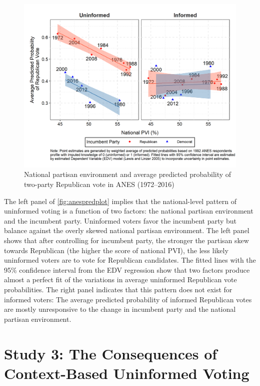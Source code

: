 \documentclass[letterpaper, 12pt]{article}
\begin{document}
    \begin{figure}[t!]
        \caption{National partisan environment and average predicted probability of two-party Republican vote in ANES (1972--2016)}
        \label{fig:anespredplot}
        \includegraphics[width=\linewidth]{../outputs/m1sq_1992_anespredplot.png}
    \end{figure}

    \par The left panel of \autoref{fig:anespredplot} implies that the national-level pattern of uninformed voting is a function of two factors: the national partisan environment and the incumbent party. Uninformed voters favor the incumbent party but balance against the overly skewed national partisan environment. The left panel shows that after controlling for incumbent party, the stronger the partisan skew towards Republican (the higher the score of national PVI), the less likely uninformed voters are to vote for Republican candidates. The fitted lines with the 95\% confidence interval from the EDV regression show that two factors produce almost a perfect fit of the variations in average uninformed Republican vote probabilities. The right panel indicates that this pattern does not exist for informed voters: The average predicted probability of informed Republican votes are mostly unresponsive to the change in incumbent party and the national partisan environment.

    \section*{Study 3: The Consequences of Context-Based Uninformed Voting}
\end{document}
